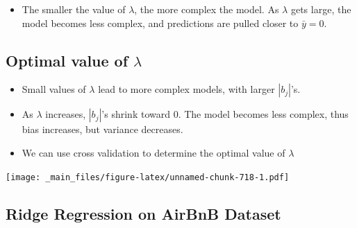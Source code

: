 \documentclass[]{book}
\newenvironment{Shaded}{\begin{snugshade}}{\end{snugshade}}
\newcommand{\KeywordTok}[1]{\textcolor[rgb]{0.13,0.29,0.53}{\textbf{#1}}}
\newcommand{\StringTok}[1]{\textcolor[rgb]{0.31,0.60,0.02}{#1}}
\newcommand{\OperatorTok}[1]{\textcolor[rgb]{0.81,0.36,0.00}{\textbf{#1}}}
\newcommand{\NormalTok}[1]{#1}
\providecommand{\tightlist}{%
  \setlength{\itemsep}{0pt}\setlength{\parskip}{0pt}}
\begin{document}
\begin{itemize}
\tightlist
\item
  The smaller the value of \(\lambda\), the more complex the model. As
  \(\lambda\) gets large, the model becomes less complex, and
  predictions are pulled closer to \(\bar{y}=0\).
\end{itemize}

\subsection{\texorpdfstring{Optimal value of
\(\lambda\)}{Optimal value of \textbackslash{}lambda}}\label{optimal-value-of-lambda}

\begin{itemize}
\tightlist
\item
  Small values of \(\lambda\) lead to more complex models, with larger
  \(|b_j|\)'s.\\
\item
  As \(\lambda\) increases, \(|b_j|\)'s shrink toward 0. The model
  becomes less complex, thus bias increases, but variance decreases.\\
\item
  We can use cross validation to determine the optimal value of
  \(\lambda\)
\end{itemize}

\texttt{[image: \_main\_files/figure-latex/unnamed-chunk-718-1.pdf]}

\subsection{Ridge Regression on AirBnB
Dataset}\label{ridge-regression-on-airbnb-dataset}

\begin{Shaded}
\end{Shaded}
\end{document}
